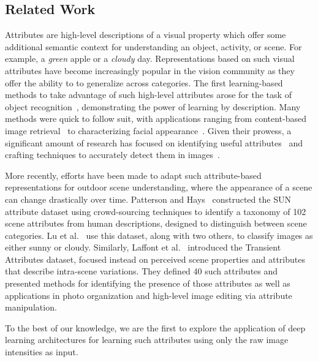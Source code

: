 \documentclass[10pt,twocolumn,letterpaper]{article}
\begin{document}
\subsection{Related Work}
\indent
Attributes are high-level descriptions of a visual property which offer some
additional semantic context for understanding an object, activity, or scene.
For example, a \emph{green} apple or a \emph{cloudy} day. Representations based
on such visual attributes have become increasingly popular in the vision
community as they offer the ability to to generalize across categories. The
first learning-based methods to take advantage of such high-level attributes
arose for the task of object
recognition~\cite{farhadi2009describing,lampert2009learning}, demonstrating the
power of learning by description. Many methods were quick to follow suit, with
applications ranging from content-based image
retrieval~\cite{siddiquie2011image} to characterizing facial
appearance~\cite{kumar2011describable}. Given their prowess, a significant
amount of research has focused on identifying useful
attributes~\cite{berg2010automatic} and crafting techniques to accurately
detect them in images~\cite{vedaldi2014understanding}. 

More recently, efforts have been made to adapt such attribute-based
representations for outdoor scene understanding, where the appearance of a
scene can change drastically over time.  Patterson and
Hays~\cite{patterson2012sun} constructed the SUN attribute dataset using
crowd-sourcing techniques to identify a taxonomy of 102 scene attributes from
human descriptions, designed to distinguish between scene categories. Lu et
al.~\cite{lutwoclass} use this dataset, along with two others, to classify
images as either sunny or cloudy.  Similarly, Laffont et al.~\cite{Laffont14}
introduced the Transient Attributes dataset, focused instead on perceived scene
properties and attributes that describe intra-scene variations. They defined 40
such attributes and presented methods for identifying the presence of those
attributes as well as applications in photo organization and high-level image
editing via attribute manipulation. 

To the best of our knowledge, we are the first to explore the application of
deep learning architectures for learning such attributes using only the raw
image intensities as input.
\end{document}
